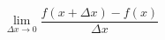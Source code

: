 \documentclass[preview]{standalone}
\begin{document}
\begin{center}
$$\lim_{\Delta x \to 0}\frac{f(x + \Delta x) - f(x)}{\Delta x}$$
\end{center}
\end{document}
